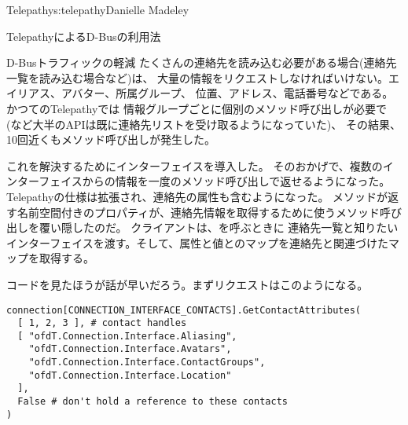 \begin{aosachapter}{Telepathy}{s:telepathy}{Danielle Madeley}
\begin{aosasect1}{TelepathyによるD-Busの利用法}
\begin{aosasect2}{D-Busトラフィックの軽減}
たくさんの連絡先を読み込む必要がある場合(連絡先一覧を読み込む場合など)は、
大量の情報をリクエストしなければいけない。エイリアス、アバター、所属グループ、
位置、アドレス、電話番号などである。かつてのTelepathyでは
情報グループごとに個別のメソッド呼び出しが必要で
(など大半のAPIは既に連絡先リストを受け取るようになっていた)、
その結果、10回近くもメソッド呼び出しが発生した。

これを解決するためにインターフェイスを導入した。
そのおかげで、複数のインターフェイスからの情報を一度のメソッド呼び出しで返せるようになった。
Telepathyの仕様は拡張され、連絡先の属性も含むようになった。
メソッドが返す名前空間付きのプロパティが、連絡先情報を取得するために使うメソッド呼び出しを覆い隠したのだ。
クライアントは、を呼ぶときに
連絡先一覧と知りたいインターフェイスを渡す。そして、属性と値とのマップを連絡先と関連づけたマップを取得する。

コードを見たほうが話が早いだろう。まずリクエストはこのようになる。

\begin{verbatim}
connection[CONNECTION_INTERFACE_CONTACTS].GetContactAttributes(
  [ 1, 2, 3 ], # contact handles
  [ "ofdT.Connection.Interface.Aliasing",
    "ofdT.Connection.Interface.Avatars",
    "ofdT.Connection.Interface.ContactGroups",
    "ofdT.Connection.Interface.Location"
  ],
  False # don't hold a reference to these contacts
)
\end{verbatim}


\end{aosasect2}
\end{aosasect1}
\end{aosachapter}
